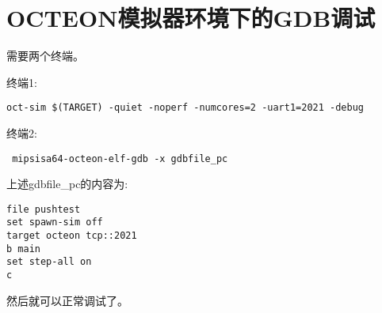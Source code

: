 \section{OCTEON模拟器环境下的GDB调试}
需要两个终端。

终端1:
\begin{verbatim}
oct-sim $(TARGET) -quiet -noperf -numcores=2 -uart1=2021 -debug
\end{verbatim}


终端2:
\begin{verbatim}
 mipsisa64-octeon-elf-gdb -x gdbfile_pc 
\end{verbatim}
上述gdbfile\_pc的内容为:

\begin{verbatim}
file pushtest
set spawn-sim off
target octeon tcp::2021
b main
set step-all on
c
\end{verbatim}

然后就可以正常调试了。
